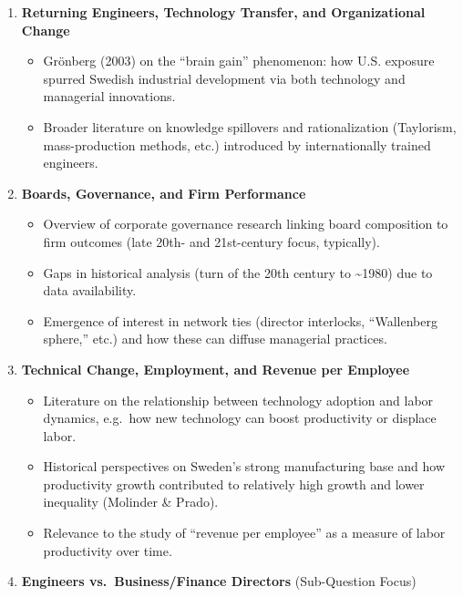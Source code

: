 \documentclass[
]{article}
\providecommand{\tightlist}{%
  \setlength{\itemsep}{0pt}\setlength{\parskip}{0pt}}\usepackage{longtable,booktabs,array}
\begin{document}
\begin{enumerate}
\def\labelenumi{\arabic{enumi}.}
\tightlist
\item
  \textbf{Returning Engineers, Technology Transfer, and Organizational
  Change}

  \begin{itemize}
  \tightlist
  \item
    Grönberg (2003) on the ``brain gain'' phenomenon: how U.S. exposure
    spurred Swedish industrial development via both technology and
    managerial innovations.\\
  \item
    Broader literature on knowledge spillovers and rationalization
    (Taylorism, mass-production methods, etc.) introduced by
    internationally trained engineers.
  \end{itemize}
\item
  \textbf{Boards, Governance, and Firm Performance}

  \begin{itemize}
  \tightlist
  \item
    Overview of corporate governance research linking board composition
    to firm outcomes (late 20th- and 21st-century focus, typically).\\
  \item
    Gaps in historical analysis (turn of the 20th century to
    \textasciitilde1980) due to data availability.\\
  \item
    Emergence of interest in network ties (director interlocks,
    ``Wallenberg sphere,'' etc.) and how these can diffuse managerial
    practices.
  \end{itemize}
\item
  \textbf{Technical Change, Employment, and Revenue per Employee}

  \begin{itemize}
  \tightlist
  \item
    Literature on the relationship between technology adoption and labor
    dynamics, e.g.~how new technology can boost productivity or displace
    labor.\\
  \item
    Historical perspectives on Sweden's strong manufacturing base and
    how productivity growth contributed to relatively high growth and
    lower inequality (Molinder \& Prado).\\
  \item
    Relevance to the study of ``revenue per employee'' as a measure of
    labor productivity over time.
  \end{itemize}
\item
  \textbf{Engineers vs.~Business/Finance Directors} (Sub-Question Focus)


\end{enumerate}
\end{document}
